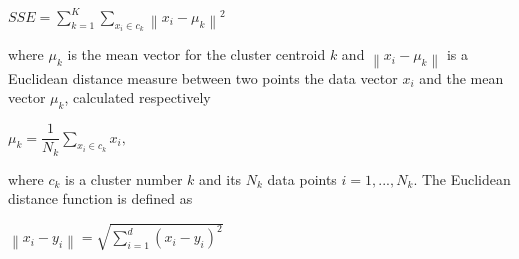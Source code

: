 \begin{center}
$SSE =\displaystyle \sum_{k=1}^{K}\displaystyle \sum_{x_i \in c_k}\left \| x_i-\mu_k \right \|^2$ 
\end{center}

where $\mu_k$ is the mean vector for the cluster centroid $k$ and $\left \| x_i-\mu_k \right \|$ is a Euclidean distance measure between two points the data vector $x_i$ and the mean vector $\mu_k$, calculated respectively

\begin{center}
$\mu_k = \dfrac{1}{N_k}\displaystyle \sum_{x_i \in c_k}x_i,$ 
\end{center}

where $c_k$ is a cluster number $k$ and its $N_k$ data points $i=1,...,N_k$. The Euclidean distance function is defined as

\begin{center}
$\left \| x_i-y_i \right \| = \sqrt{\displaystyle \sum_{i=1}^{d}(x_i-y_i)^2} $
\end{center}


